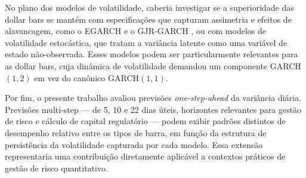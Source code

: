 No plano dos modelos de volatilidade, caberia investigar se a superioridade das dollar bars
se mantém com especificações que capturam assimetria e efeitos de alavancagem, como o
EGARCH \cite{Nelson1991} e o GJR-GARCH \cite{GlostenJagannathanRunkle1993}, ou com
modelos de volatilidade estocástica, que tratam a variância latente como uma variável
de estado não-observada. Esses modelos podem ser particularmente relevantes para as
dollar bars, cuja dinâmica de volatilidade demandou um componente GARCH$(1,2)$ em vez
do canônico GARCH$(1,1)$.

Por fim, o presente trabalho avaliou previsões \textit{one-step-ahead} da variância
diária. Previsões multi-step — de 5, 10 e 22 dias úteis, horizontes relevantes para
gestão de risco e cálculo de capital regulatório — podem exibir padrões distintos de
desempenho relativo entre os tipos de barra, em função da estrutura de persistência da
volatilidade capturada por cada modelo. Essa extensão representaria uma contribuição
diretamente aplicável a contextos práticos de gestão de risco quantitativo.
